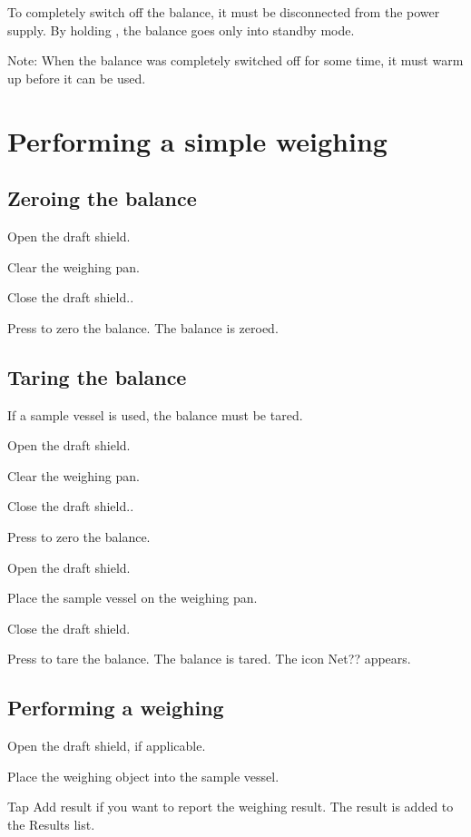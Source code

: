 \documentclass[12pt]{../SOP4_alpha}\usepackage[]{graphicx}\usepackage[]{xcolor}
\begin{document}
\NP To completely switch off the balance, it must be disconnected from the power supply. By holding , the
balance goes only into standby mode.

\NP Note: When the balance was completely switched off for some time, it must warm up before it can be used.

\section{Performing a simple weighing}

\subsection{Zeroing the balance}

\NP Open the draft shield.

\NP Clear the weighing pan.

\NP Close the draft shield..

\NP Press to zero the balance. The balance is zeroed.

\subsection{Taring the balance}

\NP If a sample vessel is used, the balance must be tared.

\NP Open the draft shield.

\NP Clear the weighing pan.

\NP Close the draft shield..

\NP Press to zero the balance.

\NP Open the draft shield.

\NP Place the sample vessel on the weighing pan.

\NP Close the draft shield.

\NP Press to tare the balance. The balance is tared. The icon Net?? appears.

\subsection{Performing a weighing}

\NP Open the draft shield, if applicable.

\NP Place the weighing object into the sample vessel.

\NP Tap Add result if you want to report the weighing result. The result is added to the Results list.
\end{document}
